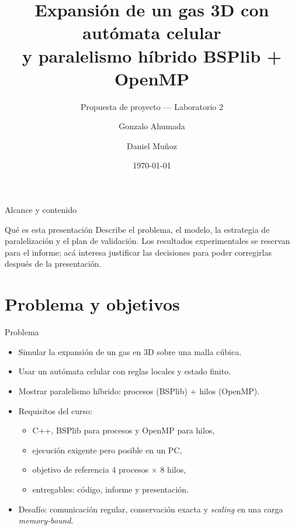 \documentclass[aspectratio=169]{beamer}
\title[Gas 3D con LGA híbrido]{Expansión de un gas 3D con autómata celular\\y paralelismo híbrido BSPlib + OpenMP}
\subtitle{Propuesta de proyecto --- Laboratorio 2}
\author[Ahumada, Muñoz]{Gonzalo Ahumada \and Daniel Muñoz}
\institute[USACH]{Laboratorio 2 --- High Performance Computing\\[1mm]
           Universidad de Santiago de Chile}
\date{\today}
\begin{document}
\begin{frame}
  \titlepage
\end{frame}

\begin{frame}{Alcance y contenido}
  \begin{block}{Qué es esta presentación}
    \footnotesize
    Describe el \alert{problema}, el \alert{modelo}, la \alert{estrategia de
    paralelización} y el \alert{plan de validación}. Los resultados
    experimentales se reservan para el informe; acá interesa justificar las
    decisiones para poder corregirlas después de la presentación.
  \end{block}
  \tableofcontents
\end{frame}

\section{Problema y objetivos}

\begin{frame}{Problema}
  \begin{itemize}
    \item Simular la \alert{expansión de un gas en 3D} sobre una malla cúbica.
    \item Usar un \alert{autómata celular} con reglas locales y estado finito.
    \item Mostrar \alert{paralelismo híbrido}: procesos (BSPlib) + hilos
          (OpenMP).
    \item Requisitos del curso:
      \begin{itemize}
        \item C++, BSPlib para procesos y OpenMP para hilos,
        \item ejecución exigente pero posible en un PC,
        \item objetivo de referencia $4$ procesos $\times$ $8$ hilos,
        \item entregables: código, informe y presentación.
      \end{itemize}
    \item Desafío: comunicación regular, conservación exacta y \emph{scaling}
          en una carga \emph{memory-bound}.
  \end{itemize}
\end{frame}
\end{document}
